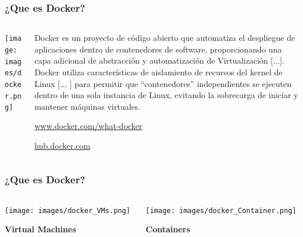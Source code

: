 \documentclass[
xcolor={svgnames},
hyperref={colorlinks,citecolor=DeepPink4,linkcolor=Black,urlcolor=DarkBlue}
]{beamer}
\begin{document}
\begin{frame}
	\frametitle{¿Que es Docker?}
	\begin{columns}[t] 
		\begin{column}{0.2\textwidth}
			\begin{center}
				\texttt{[image: images/docker.png]}
				
			\end{center}
		\end{column}
		\begin{column}{0.7\textwidth}
			\begin{block}{}
				Docker es un proyecto de código abierto que automatiza el despliegue de aplicaciones dentro de contenedores de software, proporcionando una capa adicional de abstracción y automatización de Virtualización [...]. Docker utiliza características de aislamiento de recursos del kernel de Linux [... ] para permitir que ``contenedores'' independientes se ejecuten dentro de una sola instancia de Linux, evitando la sobrecarga de iniciar y mantener máquinas virtuales.
		\nocite{wiki:docker}
			\end{block}

			\begin{center}
				\href{https://www.docker.com/what-docker}{www.docker.com/what-docker}
				
				\href{https://hub.docker.com}{hub.docker.com}
			\end{center}
		\end{column}
	\end{columns}
\end{frame}




\begin{frame}
	\frametitle{¿Que es Docker?}
	\begin{columns}[t] 
		\begin{column}{0.5\textwidth}
			\begin{center}
				\texttt{[image: images/docker\_VMs.png]}
				
				\textbf{Virtual Machines}
			\end{center}
		\end{column}
		\begin{column}{0.5\textwidth}
			\begin{center}
				\texttt{[image: images/docker\_Container.png]}
				
				\textbf{Containers}
			\end{center}
		\end{column}
	\end{columns}

\end{frame}
\end{document}
